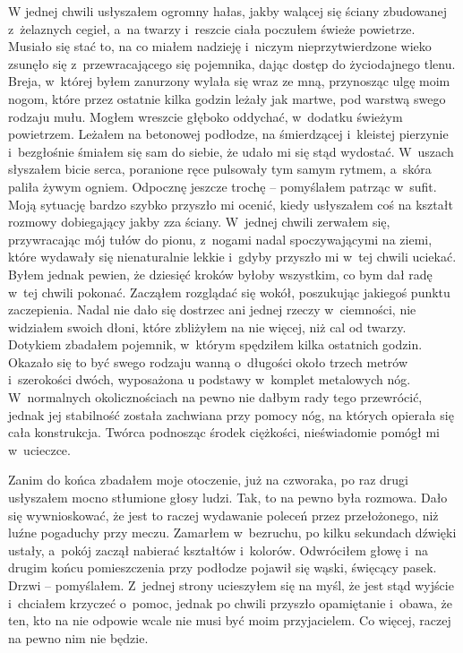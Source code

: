 W jednej chwili usłyszałem ogromny hałas, jakby walącej się ściany zbudowanej z~żelaznych cegieł, a~na twarzy i~reszcie ciała poczułem świeże powietrze. Musiało się stać to, na co miałem nadzieję i~niczym nieprzytwierdzone wieko zsunęło się z~przewracającego się pojemnika, dając dostęp do życiodajnego tlenu. Breja, w~której byłem zanurzony wylała się wraz ze mną, przynosząc ulgę moim nogom, które przez ostatnie kilka godzin leżały jak martwe, pod warstwą swego rodzaju mułu. Mogłem wreszcie głęboko oddychać, w~dodatku świeżym powietrzem. Leżałem na betonowej podłodze, na śmierdzącej i~kleistej pierzynie i~bezgłośnie śmiałem się sam do siebie, że udało mi się stąd wydostać. W~uszach słyszałem bicie serca, poranione ręce pulsowały tym samym rytmem, a~skóra paliła żywym ogniem. Odpocznę jeszcze trochę -- pomyślałem patrząc w~sufit. Moją sytuację bardzo szybko przyszło mi ocenić, kiedy usłyszałem coś na kształt rozmowy dobiegający jakby zza ściany. W~jednej chwili zerwałem się, przywracając mój tułów do pionu, z~nogami nadal spoczywającymi na ziemi, które wydawały się nienaturalnie lekkie i~gdyby przyszło mi w~tej chwili uciekać. Byłem jednak pewien, że dziesięć kroków byłoby wszystkim, co bym dał radę w~tej chwili pokonać. Zacząłem rozglądać się wokół, poszukując jakiegoś punktu zaczepienia. Nadal nie dało się dostrzec ani jednej rzeczy w~ciemności, nie widziałem swoich dłoni, które zbliżyłem na nie więcej, niż cal od twarzy. Dotykiem zbadałem pojemnik, w~którym spędziłem kilka ostatnich godzin. Okazało się to być swego rodzaju wanną o~długości około trzech metrów i~szerokości dwóch, wyposażona u podstawy w~komplet metalowych nóg. W~normalnych okolicznościach na pewno nie dałbym rady tego przewrócić, jednak jej stabilność została zachwiana przy pomocy nóg, na których opierała się cała konstrukcja. Twórca podnosząc środek ciężkości, nieświadomie pomógł mi w~ucieczce. 

Zanim do końca zbadałem moje otoczenie, już na czworaka, po raz drugi usłyszałem mocno stłumione głosy ludzi. Tak, to na pewno była rozmowa. Dało się wywnioskować, że jest to raczej wydawanie poleceń przez przełożonego, niż luźne pogaduchy przy meczu. Zamarłem w~bezruchu, po kilku sekundach dźwięki ustały, a~pokój zaczął nabierać kształtów i~kolorów. Odwróciłem głowę i~na drugim końcu pomieszczenia przy podłodze pojawił się wąski, święcący pasek. Drzwi -- pomyślałem. Z~jednej strony ucieszyłem się na myśl, że jest stąd wyjście i~chciałem krzyczeć o~pomoc, jednak po chwili przyszło opamiętanie i~obawa, że ten, kto na nie odpowie wcale nie musi być moim przyjacielem. Co więcej, raczej na pewno nim nie będzie. 

